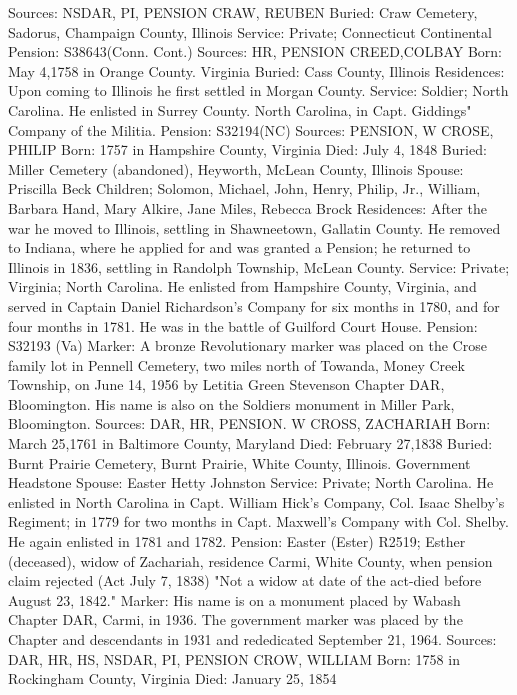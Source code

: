 Sources: NSDAR, PI, PENSION 
CRAW, REUBEN 
Buried: Craw Cemetery, Sadorus, Champaign County, Illinois 
Service: Private; Connecticut Continental 
Pension: S38643(Conn. Cont.) 
Sources: HR, PENSION 
CREED,COLBAY 
Born: May 4,1758 in Orange County. Virginia 
Buried: Cass County, Illinois 
Residences: Upon coming to Illinois he first settled in Morgan County. 
Service: Soldier; North Carolina. He enlisted in Surrey County. North Carolina, in Capt. Giddings" Company of the Militia. 
Pension: S32194(NC)
Sources: PENSION, W 
CROSE, PHILIP 
Born: 1757 in Hampshire County, Virginia 
Died: July 4, 1848 
Buried: Miller Cemetery (abandoned), Heyworth, McLean County, Illinois 
Spouse: Priscilla Beck 
Children; Solomon, Michael, John, Henry, Philip, Jr., William, Barbara Hand, Mary Alkire, Jane Miles, Rebecca Brock 
Residences: After the war he moved to Illinois, settling in Shawneetown, Gallatin County. He removed to Indiana, where he applied for and was granted a Pension; he returned to Illinois in 1836, settling in Randolph Township, McLean County. 
Service: Private; Virginia; North Carolina. He enlisted from Hampshire County, Virginia, and served in Captain Daniel Richardson's Company for six months in 1780, and for four months in 1781. He was in the battle of Guilford Court House. 
Pension: S32193 (Va) 
Marker: A bronze Revolutionary marker was placed on the Crose family lot in Pennell Cemetery, two miles north of Towanda, Money Creek Township, on June 14, 1956 by Letitia Green Stevenson Chapter DAR, Bloomington. His name is also on the Soldiers monument in Miller Park, Bloomington. 
Sources: DAR, HR, PENSION. W 
CROSS, ZACHARIAH 
Born: March 25,1761 in Baltimore County, Maryland 
Died: February 27,1838 
Buried: Burnt Prairie Cemetery, Burnt Prairie, White County, Illinois. Govern­ment Headstone 
Spouse: Easter Hetty Johnston 
Service: Private; North Carolina. He enlisted in North Carolina in Capt. William Hick's Company, Col. Isaac Shelby's Regiment; in 1779 for two months in Capt. Maxwell's Company with Col. Shelby. He again enlisted in 1781 and 1782. 
Pension: Easter (Ester) R2519; Esther (deceased), widow of Zachariah, residence Carmi, White County, when pension claim rejected (Act July 7, 1838) "Not a widow at date of the act-died before August 23, 1842." 
Marker: His name is on a monument placed by Wabash Chapter DAR, Carmi, in 1936. The government marker was placed by the Chapter and descendants in 1931 and rededicated September 21, 1964. 
Sources: DAR, HR, HS, NSDAR, PI, PENSION 
CROW, WILLIAM 
Born: 1758 in Rockingham County, Virginia 
Died: January 25, 1854 
